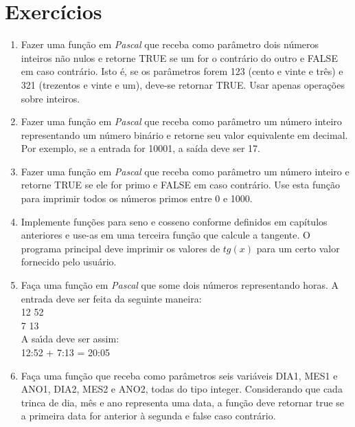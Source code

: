 \section{Exercícios}


\begin{enumerate}

\item Fazer uma função em \emph{Pascal} que receba como parâmetro 
   dois números inteiros não nulos e retorne TRUE se um for o contrário 
   do outro e FALSE em caso contrário. Isto é, se os parâmetros forem
   123 (cento e vinte e três) e 321 (trezentos e vinte e um), deve-se 
   retornar TRUE. Usar apenas operações sobre inteiros. 

\item Fazer uma  função  em \emph{Pascal}  
   que  receba como  parâmetro um  número
   inteiro  representando   um  número  binário  e   retorne  seu  valor
   equivalente em decimal. Por exemplo, se a entrada for 10001, a saída 
   deve ser 17. 

\item Fazer uma  função  em  \emph{Pascal}
   que  receba como  parâmetro um  número
   inteiro  e   retorne  TRUE  se  ele   for  primo  e   FALSE  em  caso
   contrário.  Use esta  função para  imprimir todos  os  números primos
   entre 0 e 1000. 

\item Implemente funções para seno e cosseno conforme definidos em 
   capítulos anteriores e use-as em uma terceira função que calcule a
   tangente. O programa principal deve imprimir os valores de $tg(x)$ 
   para um certo valor fornecido pelo usuário.

\item Faça uma função em \emph{Pascal} 
que some dois números representando horas. 
                  A entrada deve ser feita da seguinte maneira: \\
                        12 52 \\
                        7 13 \\
                  A sa\'{\i}da deve ser assim: \\
                  12:52 + 7:13 = 20:05
 
\item Faça uma função que receba como parâmetros seis variáveis 
DIA1, MES1 e ANO1, DIA2, MES2 e ANO2, todas do tipo integer. 
Considerando que cada trinca de dia, 
                  mês e ano representa uma data, a função deve retornar 
\textsf{true} se a primeira 
                  data for anterior à segunda e \textsf{false} 
caso contrário.



\end{enumerate}
